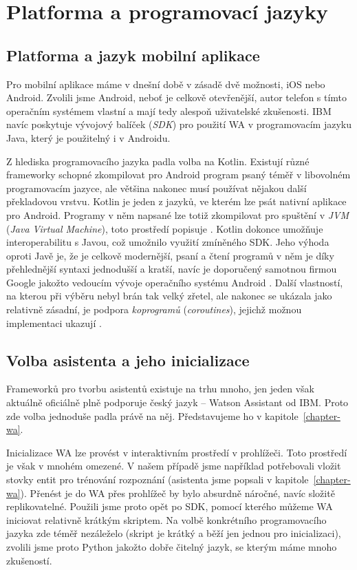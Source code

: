 \section{Platforma a programovací jazyky}\label{analysis}

\subsection{Platforma a jazyk mobilní aplikace}
Pro mobilní aplikace máme v dnešní době v zásadě dvě možnosti, iOS nebo Android.
Zvolili jsme Android, neboť je celkově otevřenější, autor telefon s tímto
operačním systémem vlastní a mají tedy alespoň uživatelské zkušenosti. IBM navíc
poskytuje vývojový balíček (\textit{SDK}) pro použití WA v programovacím
jazyku Java, který je použitelný i v Androidu.

Z hlediska programovacího jazyka padla volba na Kotlin. Existují různé frameworky
schopné zkompilovat pro Android program psaný téměř v libovolném programovacím
jazyce, ale většina nakonec musí používat nějakou další překladovou vrstvu.
Kotlin je jeden z jazyků, ve kterém lze psát nativní aplikace pro Android. Programy
v něm napsané lze totiž zkompilovat pro spuštění v \textit{JVM} (\textit{Java Virtual Machine}),
toto prostředí popisuje \citet{prof_tejinder_singh_hotspot_2014}.
Kotlin dokonce umožňuje interoperabilitu s Javou, což umožnilo
využití zmíněného SDK. Jeho výhoda oproti Javě je, že je celkově modernější,
psaní a čtení programů v něm je díky přehlednější syntaxi jednodušší a kratší,
navíc je doporučený samotnou firmou Google jakožto vedoucím vývoje operačního
systému Android \citep{android_blog}.
Další vlastností, na kterou při výběru nebyl brán tak velký
zřetel, ale nakonec se ukázala jako relativně zásadní, je podpora \textit{koprogramů}
(\textit{coroutines}), jejichž možnou implementaci ukazují \citet{theory_practice_coroutines}.

\subsection{Volba asistenta a jeho inicializace}
Frameworků pro tvorbu asistentů existuje na trhu mnoho, jen jeden však aktuálně oficiálně plně
podporuje český jazyk -- Watson Assistant od IBM. Proto zde volba jednoduše
padla právě na něj. Představujeme ho v kapitole~\ref{chapter-wa}.

Inicializace WA lze provést v interaktivním prostředí v prohlížeči. Toto
prostředí je však v mnohém omezené. V našem případě jsme například potřebovali
vložit stovky entit pro trénování rozpoznání (asistenta jsme popsali v
kapitole~\ref{chapter-wa}). Přenést je do WA přes prohlížeč
by bylo absurdně náročné, navíc složitě replikovatelné. Použili jsme proto opět
po SDK, pomocí kterého můžeme WA iniciovat relativně krátkým skriptem. Na volbě
konkrétního programovacího jazyka zde téměř nezáleželo (skript je krátký a běží
jen jednou pro inicializaci), zvolili jsme proto Python jakožto dobře čitelný
jazyk, se kterým máme mnoho zkušeností.

